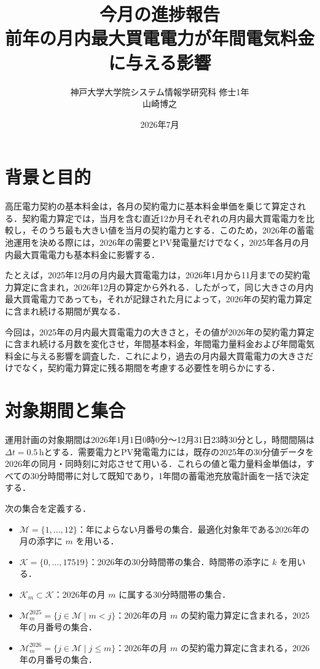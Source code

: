 \documentclass[a4paper,11pt,dvipdfmx]{jsarticle}
\title{今月の進捗報告\\[0.5em]\large 前年の月内最大買電電力が年間電気料金に与える影響}
\author{神戸大学大学院システム情報学研究科 修士1年\\山崎博之}
\date{2026年7月}
\begin{document}
\maketitle

\section{背景と目的}

高圧電力契約の基本料金は，各月の契約電力に基本料金単価を乗じて算定される．契約電力算定では，当月を含む直近12か月それぞれの月内最大買電電力を比較し，そのうち最も大きい値を当月の契約電力とする．このため，2026年の蓄電池運用を決める際には，2026年の需要とPV発電量だけでなく，2025年各月の月内最大買電電力も基本料金に影響する．

たとえば，2025年12月の月内最大買電電力は，2026年1月から11月までの契約電力算定に含まれ，2026年12月の算定から外れる．したがって，同じ大きさの月内最大買電電力であっても，それが記録された月によって，2026年の契約電力算定に含まれ続ける期間が異なる．

今回は，2025年の月内最大買電電力の大きさと，その値が2026年の契約電力算定に含まれ続ける月数を変化させ，年間基本料金，年間電力量料金および年間電気料金に与える影響を調査した．これにより，過去の月内最大買電電力の大きさだけでなく，契約電力算定に残る期間を考慮する必要性を明らかにする．

\section{対象期間と集合}

運用計画の対象期間は2026年1月1日0時0分～12月31日23時30分とし，時間間隔は $\Delta t=0.5$\,hとする．需要電力とPV発電電力には，既存の2025年の30分値データを2026年の同月・同時刻に対応させて用いる．これらの値と電力量料金単価は，すべての30分時間帯に対して既知であり，1年間の蓄電池充放電計画を一括で決定する．

次の集合を定義する．

\begin{itemize}
    \item $\mathcal{M}=\{1,\ldots,12\}$：年によらない月番号の集合．最適化対象年である2026年の月の添字に $m$ を用いる．
    \item $\mathcal{K}=\{0,\ldots,17519\}$：2026年の30分時間帯の集合．時間帯の添字に $k$ を用いる．
    \item $\mathcal{K}_m \subset \mathcal{K}$：2026年の月 $m$ に属する30分時間帯の集合．
    \item $\mathcal{M}_m^{2025}=\{j\in\mathcal{M}\mid m<j\}$：2026年の月 $m$ の契約電力算定に含まれる，2025年の月番号の集合．
    \item $\mathcal{M}_m^{2026}=\{j\in\mathcal{M}\mid j\leq m\}$：2026年の月 $m$ の契約電力算定に含まれる，2026年の月番号の集合．
\end{itemize}
\end{document}
